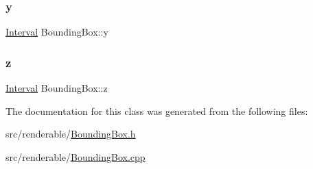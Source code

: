 \mbox{\label{classBoundingBox_a593fd6b66d3ed0352d92024685863090}} 
\subsubsection{\texorpdfstring{y}{y}}
{\footnotesize\ttfamily \mbox{\hyperlink{classInterval}{Interval}} Bounding\+Box\+::y\hspace{0.3cm}{\ttfamily [private]}}

\mbox{\label{classBoundingBox_a9a6005ebe3550447aad804123fa68fea}} 
\subsubsection{\texorpdfstring{z}{z}}
{\footnotesize\ttfamily \mbox{\hyperlink{classInterval}{Interval}} Bounding\+Box\+::z\hspace{0.3cm}{\ttfamily [private]}}



The documentation for this class was generated from the following files\+:\begin{DoxyCompactItemize}
\item 
src/renderable/\mbox{\hyperlink{BoundingBox_8h}{Bounding\+Box.\+h}}\item 
src/renderable/\mbox{\hyperlink{BoundingBox_8cpp}{Bounding\+Box.\+cpp}}\end{DoxyCompactItemize}
